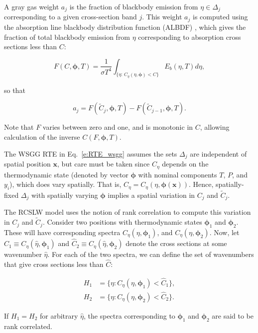 \documentclass[preprint,12pt, a4paper]{elsarticle}
\newcommand{\BS}{\boldsymbol}
\begin{document}
A gray gas weight $a_j$ is the fraction of blackbody emission from $\eta\in\Delta_j$ corresponding to a given cross-section band $j$. This weight $a_j$ is computed using the absorption line blackbody distribution function (ALBDF) \cite{Pearson_2014}, which gives the fraction of total blackbody emission from $\eta$ corresponding to absorption cross sections less than $C$: 
%
\begin{linenomath}
    \begin{equation} \label{e:albdf}
        F(C,\BS{\phi},T) = \frac{1}{\sigma T^4}\int_{\{\eta:\,C_\eta(\eta,\BS{\phi})<C\}}E_b(\eta,T)d\eta,
\end{equation}
\end{linenomath}
%
so that
%
\begin{linenomath}
    \begin{equation}\label{e:aj}
    a_j = F(\tilde{C}_j,\BS{\phi}, T) - F(\tilde{C}_{j-1}, \BS{\phi},T).
\end{equation}
\end{linenomath}
%
Note that $F$ varies between zero and one, and is monotonic in $C$, allowing calculation of the inverse $C(F,\BS{\phi},T)$.

The WSGG RTE in Eq.~\ref{e:RTE_wsgg} assumes the sets $\Delta_j$ are independent of spatial position $\mathbf{x}$, but care must be taken since $C_\eta$ depends on the thermodynamic state (denoted by vector $\BS{\phi}$ with nominal components $T$, $P$, and $y_i$), which does vary spatially. That is, $C_\eta=C_\eta(\eta,\BS{\phi}(\mathbf{x}))$. Hence, spatially-fixed $\Delta_j$ with spatially varying $\BS{\phi}$ implies a spatial variation in $C_j$ and $\tilde{C}_j$.
 
The RCSLW model uses the notion of rank correlation to compute this variation in $C_j$ and $\tilde{C}_j$. 
Consider two positions with thermodynamic states $\BS{\phi}_1$ and $\BS{\phi}_2$. These will have corresponding spectra $C_\eta(\eta,\BS{\phi}_1)$, and $C_\eta(\eta,\BS{\phi}_2)$.
Now, let $\hat{C}_1\equiv C_\eta(\hat{\eta},\BS{\phi}_1)$ and $\hat{C}_2\equiv C_\eta(\hat{\eta},\BS{\phi}_2)$ denote the cross sections at some wavenumber $\hat{\eta}$. For each of the two spectra, we can define the set of wavenumbers that give cross sections less than $\hat{C}$:
%
\begin{linenomath}
\begin{align}
    H_1&=\{\eta: C_\eta(\eta,\BS{\phi}_1)<\hat{C}_1\}, \\
    H_2&=\{\eta: C_\eta(\eta,\BS{\phi}_2)<\hat{C}_2\}.
    \end{align}
\end{linenomath}
%
If $H_1=H_2$ for arbitrary $\hat{\eta}$, the spectra corresponding to $\BS{\phi}_1$ and $\BS{\phi}_2$ are said to be rank correlated.
\end{document}
